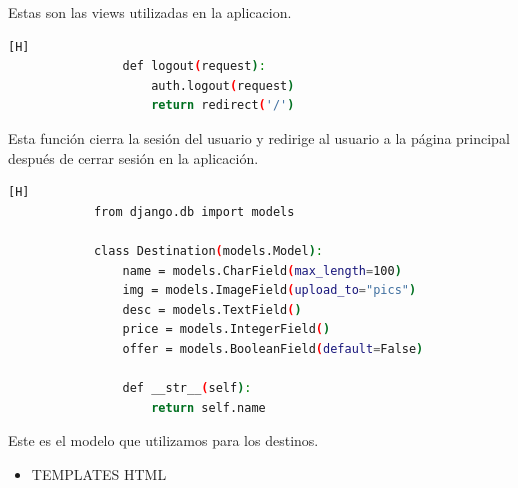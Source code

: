 \documentclass{article}
\begin{document}
            Estas son las views utilizadas en la aplicacion.
            
            \begin{lstlisting}[language=bash,caption={Tercera funcion de views.py}][H]
                def logout(request):
                    auth.logout(request)
                    return redirect('/')  
    	\end{lstlisting}
     
            Esta función cierra la sesión del usuario y redirige al usuario a la página principal después de cerrar sesión en la aplicación.

            \begin{lstlisting}[language=bash,caption={models.py}][H]
            from django.db import models
            
            class Destination(models.Model):
                name = models.CharField(max_length=100)
                img = models.ImageField(upload_to="pics")
                desc = models.TextField()
                price = models.IntegerField()
                offer = models.BooleanField(default=False)
            
                def __str__(self):
                    return self.name
    	\end{lstlisting}
     
            Este es el modelo que utilizamos para los destinos.
    

            \begin{itemize}	
    		\item TEMPLATES HTML
    	\end{itemize}
     
\end{document}
